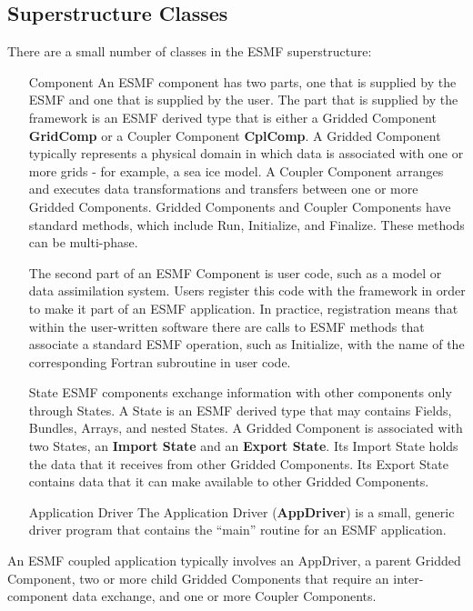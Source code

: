\subsection{Superstructure Classes}

There are a small number of classes in the ESMF superstructure:

\begin{itemize}
\item [Component]  An ESMF component has two parts, one that is 
supplied by the ESMF and one that is supplied by the user.  The
part that is supplied by the framework is an ESMF derived type that
is either a Gridded Component {\bf GridComp} or a Coupler 
Component {\bf CplComp}.  A Gridded Component typically represents
a physical domain in which data is associated with one or more 
grids - for example, a sea ice model.  A Coupler Component 
arranges and executes data transformations and transfers between 
one or more Gridded Components. Gridded Components and Coupler 
Components have standard methods, which include Run, Initialize,
and Finalize.  These methods can be multi-phase.

The second part of an ESMF Component is user code, such as a
model or data assimilation system.  Users register this code with 
the framework in order to make it part of an ESMF application.  
In practice, registration means that within the user-written 
software there are calls to ESMF methods that associate a 
standard ESMF operation, such as Initialize, with the name of 
the corresponding Fortran subroutine in user code.  

\item [State]  ESMF components exchange information with other 
components only through States.  A State is an ESMF derived
type that may contains Fields, Bundles, Arrays, and nested
States.  A Gridded Component  is associated with two States, an 
{\bf Import State} and an {\bf Export State}.  Its Import State 
holds the data that it receives from other Gridded Components.  
Its Export State contains data that it can make available to 
other Gridded Components. 

\item [Application Driver] The Application Driver ({\bf AppDriver}) 
is a small, generic driver program that contains the ``main'' 
routine for an ESMF application.

\end{itemize}

An ESMF coupled application typically involves an AppDriver, a parent 
Gridded Component, two or more child Gridded Components that require 
an inter-component data exchange, and one or more Coupler 
Components. 

